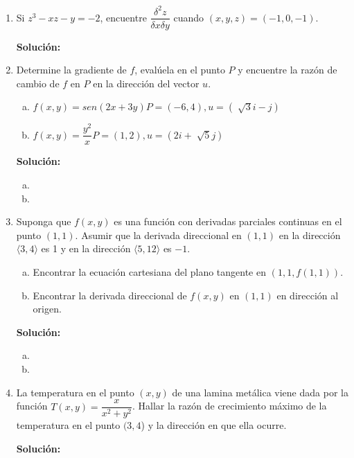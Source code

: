 \documentclass[12pt]{article}
\newenvironment{solucion}
{\begin{mdframed}[backgroundcolor=black!10]
		{\bf Solución:}\\
	}
	{
	\end{mdframed}
}
\newenvironment{preguntas}
{\begin{enumerate}\itemsep12pt
	}
	{
	\end{enumerate}
}
\begin{document}
\begin{preguntas}
\item Si $z^3 - xz - y = -2$, encuentre $\dfrac{\delta^2z}{\delta x \delta y}$ cuando $(x,y,z) = (-1, 0, -1)$.
\begin{solucion}

\end{solucion}
\item Determine la gradiente de $f$, evalúela en el punto $P$ y encuentre la razón de cambio de $f$ en $P$ en la dirección del vector $u$.
\begin{enumerate}[a)]
\item $f(x,y) = sen(2x+3y)$\tab$P=(-6,4), u=\left(\sqrt[]{3}i - j\right)$
\item $f(x,y) = \dfrac{y^2}{x}$\tab$P=(1,2), u=\left(2i + \sqrt[]{5}j\right)$
\end{enumerate}
\begin{solucion}

\begin{enumerate}[a)]
\item 
\item 
\end{enumerate}
\end{solucion}
\item Suponga que $f(x,y)$ es una función con derivadas parciales continuas en el punto $(1,1)$. Asumir que la derivada direccional en $(1,1)$ en la dirección $\langle3,4\rangle$ 			es 1 y en la dirección $\langle5,12\rangle$ es $-1$.
\begin{enumerate}[a)]
\item Encontrar la ecuación cartesiana del plano tangente en $(1,1,f(1,1))$.
\item Encontrar la derivada direccional de $f(x,y)$ en $(1,1)$ en dirección al origen.	
\end{enumerate}
\begin{solucion}

\begin{enumerate}[a)]
\item 
\item 
\end{enumerate}
\end{solucion}
\item La temperatura en el punto $(x,y)$ de una lamina metálica viene dada por la función $T(x,y) = \dfrac{x}{x^2+y^2}$. Hallar la razón de crecimiento máximo de la temperatura en el punto $(3,4$) y la dirección en que ella ocurre.
\begin{solucion}


\end{solucion}
\end{preguntas}
\end{document}
